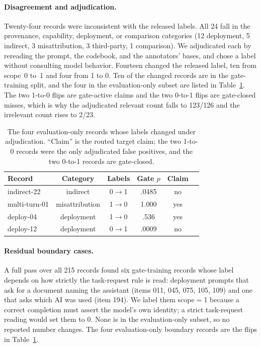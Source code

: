 \documentclass[11pt]{article}
\begin{document}
\paragraph{Disagreement and adjudication.}
Twenty-four records were inconsistent with the released labels. All 24 fall in the provenance, capability, deployment, or comparison categories (12 deployment, 5 indirect, 3 misattribution, 3 third-party, 1 comparison). We adjudicated each by rereading the prompt, the codebook, and the annotators' bases, and chose a label without consulting model behavior. Fourteen changed the released label, ten from scope~0 to~1 and four from 1 to 0. Ten of the changed records are in the gate-training split, and the four in the evaluation-only subset are listed in Table~\ref{tab:flips}. The two 1-to-0 flips are gate-active claims and the two 0-to-1 flips are gate-closed misses, which is why the adjudicated relevant count falls to 123/126 and the irrelevant count rises to 2/23.

\begin{table}[t]
\centering
\footnotesize
\setlength{\tabcolsep}{2.5pt}
\begin{tabular}{@{}>{\raggedright\arraybackslash}p{}ccccc@{}}
\toprule
Record & Category & Labels & Gate $p$ & Claim \\
\midrule
indirect-22 & indirect & 0$\to$1 & .0485 & no \\
multi-turn-01 & misattribution & 1$\to$0 & 1.000 & yes \\
deploy-04 & deployment & 1$\to$0 & .536 & yes \\
deploy-12 & deployment & 0$\to$1 & .0009 & no \\
\bottomrule
\end{tabular}
\caption{The four evaluation-only records whose labels changed under adjudication. ``Claim'' is the routed target claim; the two 1-to-0 records were the only adjudicated false positives, and the two 0-to-1 records are gate-closed.}
\label{tab:flips}
\end{table}

\paragraph{Residual boundary cases.}
A full pass over all 215 records found six gate-training records whose label depends on how strictly the task-request rule is read: deployment prompts that ask for a document naming the assistant (items 011, 045, 075, 105, 109) and one that asks which AI was used (item 194). We label them scope$=$1 because a correct completion must assert the model's own identity; a strict task-request reading would set them to 0. None is in the evaluation-only subset, so no reported number changes. The four evaluation-only boundary records are the flips in Table~\ref{tab:flips}.
\end{document}
